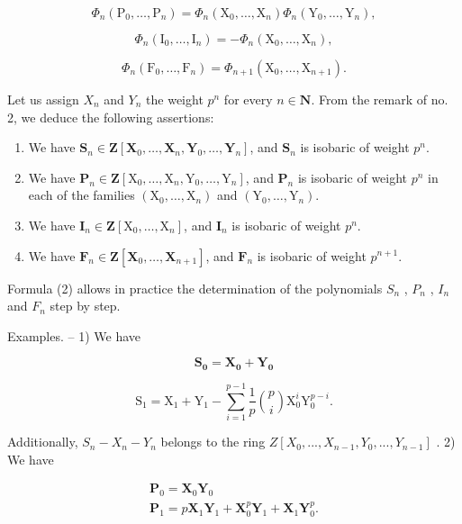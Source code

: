 \[
\Phi_ {n} \left(\mathrm{P} _ {0}, \dots , \mathrm{P} _ {n}\right) = \Phi_ {n} \left(\mathrm{X} _ {0}, \dots , \mathrm{X} _ {n}\right) \Phi_ {n} \left(\mathrm{Y} _ {0}, \dots , \mathrm{Y} _ {n}\right),\tag{14}
\]

\[
\Phi_ {n} (\mathrm{I} _ {0}, \dots , \mathrm{I} _ {n}) = - \Phi_ {n} (\mathrm{X} _ {0}, \dots , \mathrm{X} _ {n}),\tag{15}
\]

\[
\Phi_ {n} \left(\mathrm{F} _ {0}, \dots , \mathrm{F} _ {n}\right) = \Phi_ {n + 1} \left(\mathrm{X} _ {0}, \dots , \mathrm{X} _ {n + 1}\right).
\]

Let us assign \(X_{n}\) and \(Y_{n}\) the weight \(p^{n}\) for every \(n \in \mathbf{N}\). From the remark of no. 2, we deduce the following assertions:

\begin{enumerate}
\def\labelenumi{\alph{enumi})}
\item
  We have \(\mathbf{S}_n\in \mathbf{Z}[\mathbf{X}_0,\dots ,\mathbf{X}_n,\mathbf{Y}_0,\dots ,\mathbf{Y}_n]\), and \(\mathbf{S}_n\) is isobaric of weight \(p^n\).
\item
  We have \(\mathbf{P}_n\in \mathbf{Z}[\mathrm{X}_0,\dots ,\mathrm{X}_n,\mathrm{Y}_0,\dots ,\mathrm{Y}_n]\), and \(\mathbf{P}_n\) is isobaric of weight \(p^n\) in each of the families \((\mathrm{X}_0,\dots ,\mathrm{X}_n)\) and \((\mathrm{Y}_0,\dots ,\mathrm{Y}_n)\).
\item
  We have \(\mathbf{I}_n\in \mathbf{Z}[\mathrm{X}_0,\dots ,\mathrm{X}_n]\), and \(\mathbf{I}_n\) is isobaric of weight \(p^n\).
\item
  We have \(\mathbf{F}_n\in \mathbf{Z}[\mathbf{X}_0,\dots ,\mathbf{X}_{n + 1}]\), and \(\mathbf{F}_n\) is isobaric of weight \(p^{n + 1}\).
\end{enumerate}

Formula (2) allows in practice the determination of the polynomials \(S_{n}\) , \(P_{n}\) , \(I_{n}\) and \(F_{n}\) step by step.

Examples. -- 1) We have

\[
\mathbf {S _ {0}} = \mathbf {X _ {0}} + \mathbf {Y _ {0}}
\]

\[
\mathrm{S} _ {1} = \mathrm{X} _ {1} + \mathrm{Y} _ {1} - \sum_ {i = 1} ^ {p - 1} \frac {1}{p} \binom {p} {i} \mathrm{X} _ {0} ^ {i} \mathrm{Y} _ {0} ^ {p - i}.
\]

Additionally, \(S_{n} - X_{n} - Y_{n}\) belongs to the ring \(Z[X_{0}, ..., X_{n-1}, Y_{0}, ..., Y_{n-1}]\) . 2) We have

\[
\begin{array}{l} \mathbf {P} _ {0} = \mathbf {X} _ {0} \mathbf {Y} _ {0} \\ \mathbf {P} _ {1} = p \mathbf {X} _ {1} \mathbf {Y} _ {1} + \mathbf {X} _ {0} ^ {p} \mathbf {Y} _ {1} + \mathbf {X} _ {1} \mathbf {Y} _ {0} ^ {p}. \end{array}
\]

